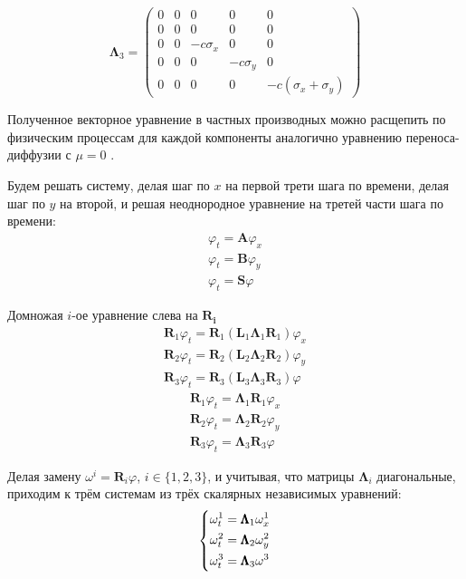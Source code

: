 \begin{equation*}
    \pmb{\Lambda}_3 = \begin{pmatrix}
        0 & 0 & 0 & 0 & 0 \\
        0 & 0 & 0 & 0 & 0 \\
        0 & 0 & -c \sigma_x & 0 & 0 \\
        0 & 0 & 0 & -c \sigma_y & 0 \\
        0 & 0 & 0 & 0 & -c (\sigma_x + \sigma_y)
    \end{pmatrix}
\end{equation*}

Полученное векторное уравнение в частных производных можно расщепить по физическим процессам для каждой компоненты аналогично уравнению переноса-диффузии с $\mu = 0$ \cite{rashep_marchuk}.

Будем решать систему, делая шаг по $x$ на первой трети шага по времени, делая шаг по $y$ на второй, и решая неоднородное уравнение на третей части шага по времени:
\begin{gather*} 
	\label{eq:pml_eq_split_1} \varphi_t = \pmb{A} \varphi_x \\
	\label{eq:pml_eq_split_2} \varphi_t = \pmb{B} \varphi_y \\
	\label{eq:pml_eq_split_3} \varphi_t = \pmb{S} \varphi
\end{gather*}

Домножая $i$-ое уравнение слева на $\pmb{R_i}$
\begin{gather*} 
    \pmb{R}_1 \varphi_t = \pmb{R}_1\left(\pmb{L}_1 \pmb{\Lambda}_1 \pmb{R}_1\right) \varphi_x \\
	\pmb{R}_2 \varphi_t = \pmb{R}_2\left(\pmb{L}_2 \pmb{\Lambda}_2 \pmb{R}_2\right) \varphi_y \\
	\pmb{R}_3 \varphi_t = \pmb{R}_3\left(\pmb{L}_3 \pmb{\Lambda}_3\pmb{ R}_3\right) \varphi
\end{gather*}
\begin{gather*} 
    \pmb{R}_1 \varphi_t = \pmb{\Lambda}_1 \pmb{R}_1 \varphi_x \\
	\pmb{R}_2 \varphi_t = \pmb{\Lambda}_2 \pmb{R}_2 \varphi_y \\
	\pmb{R}_3 \varphi_t = \pmb{\Lambda}_3 \pmb{R}_3 \varphi
\end{gather*}
    
Делая замену $\omega^i = \pmb{R}_i\varphi $, $i\in\{1,2,3\}$, и учитывая, что матрицы $\pmb{\Lambda}_i$ диагональные, приходим к трём системам из трёх скалярных независимых уравнений:
\begin{equation}
\begin{dcases}
    \omega^1_t = \pmb{\Lambda}_1 \omega^1_x \\
	\omega^2_t = \pmb{\Lambda}_2 \omega^2_y \\
	\omega^3_t = \pmb{\Lambda}_3 \omega^3
\end{dcases}
\label{eq:pml_grid_char_sys}
\end{equation}

